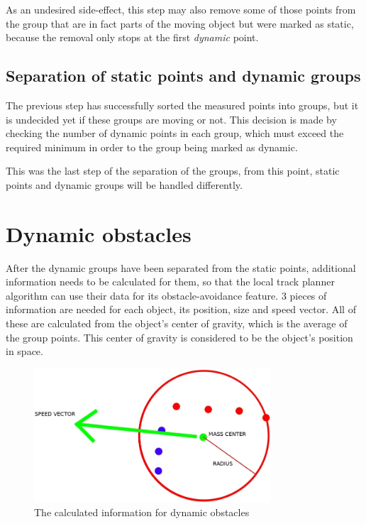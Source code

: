 As an undesired side-effect, this step may also remove some of those points from the group that are in fact parts of the moving object but were marked as static, because the removal only stops at the first \textit{dynamic} point.

\subsection{Separation of static points and dynamic groups}

The previous step has successfully sorted the measured points into groups, but it is undecided yet if these groups are moving or not. This decision is made by checking the number of dynamic points in each group, which must exceed the required minimum in order to the group being marked as dynamic.

This was the last step of the separation of the groups, from this point, static points and dynamic groups will be handled differently.

\section{Dynamic obstacles}
After the dynamic groups have been separated from the static points, additional information needs to be calculated for them, so that the local track planner algorithm can use their data for its obstacle-avoidance feature. 3 pieces of information are needed for each object, its position, size and speed vector. All of these are calculated from the object's center of gravity, which is the average of the group points. This center of gravity is considered to be the object's position in space.

\begin{figure}[!ht]
    \centering
    \includegraphics[height=50mm]{figures/raw/jpeg/dynamic_information.jpg}
    \caption{The calculated information for dynamic obstacles}
    \label{dynamic_information}
\end{figure}

